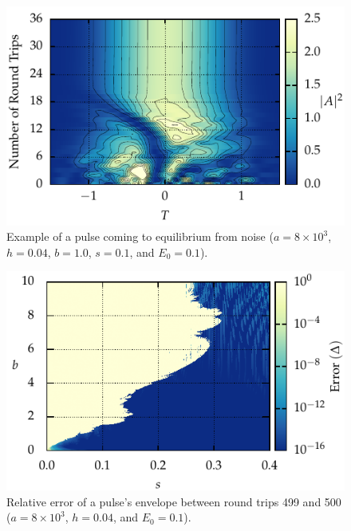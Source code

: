 \documentclass[9pt,twocolumn,twoside]{osajnl}
\begin{document}
\begin{figure}[tbp]
	\centering
	\includegraphics{Figures/Conv}
	\caption{Example of a pulse coming to equilibrium from noise ($a = 8 \times 10^3$, $h = 0.04$, $b = 1.0$, $s = 0.1$, and $E_0 = 0.1$).}
	\label{fig:convevo}
\end{figure}

\begin{figure}[tbp]
	\centering
	\includegraphics{Figures/ParamSpaceErr}
	\caption{Relative error of a pulse's envelope between round trips 499 and 500 ($a = 8 \times 10^3$, $h = 0.04$, and $E_0 = 0.1$).}
	\label{fig:error}
\end{figure}
\end{document}
